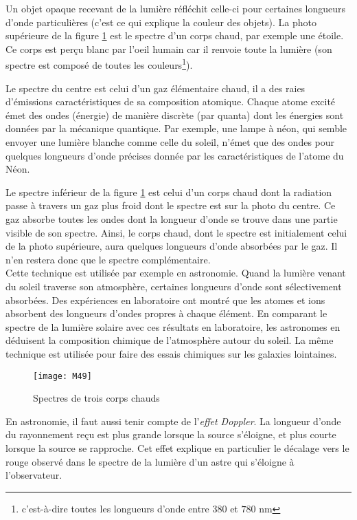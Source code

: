 \noindent Un objet opaque recevant de la lumière réfléchit celle-ci pour certaines longueurs d'onde particulières (c'est ce qui explique la couleur des objets). La photo supérieure de la figure \ref{d15} est le spectre d'un corps chaud, par exemple une étoile. Ce corps est perçu blanc par l'oeil humain car il renvoie toute la lumière (son spectre est composé de toutes les couleurs\footnote{c'est-à-dire toutes les longueurs d'onde entre $380$ et $780$ nm}).

\noindent Le spectre du centre est celui d'un gaz élémentaire chaud, il a des raies d'émissions caractéristiques de sa composition atomique. Chaque atome excité émet des ondes (énergie) de manière discrète (par quanta) dont les énergies sont données par la mécanique quantique. Par exemple, une lampe à néon, qui semble envoyer une lumière blanche comme celle du soleil, n'émet que des ondes pour quelques longueurs d'onde précises donnée par les caractéristiques de l'atome du Néon.

\noindent Le spectre inférieur de la figure \ref{d15} est celui d'un corps chaud dont la radiation passe à travers un gaz plus froid dont le spectre est sur la photo du centre. Ce gaz absorbe toutes les ondes dont la longueur d'onde se trouve dans une partie visible de son spectre. Ainsi, le corps chaud, dont le spectre est initialement celui de la photo supérieure, aura quelques longueurs d'onde absorbées par le gaz. Il n'en restera donc que le spectre complémentaire.\\

\noindent Cette technique est utilisée par exemple en astronomie. Quand la lumière venant du soleil traverse son atmosphère, certaines longueurs d'onde sont sélectivement absorbées. Des expériences en laboratoire ont montré que les atomes et ions absorbent des longueurs d'ondes propres à chaque élément. En comparant le spectre de la lumière solaire avec ces résultats en laboratoire, les astronomes en déduisent la composition chimique de l'atmosphère autour du soleil. La même technique est utilisée pour faire des essais chimiques sur les galaxies lointaines.

\begin{figure}[h!]
    \centering
    \texttt{[image: M49]}
    \caption{Spectres de trois corps chauds}
    \label{d15}
\end{figure}

\noindent En astronomie, il faut aussi tenir compte de l'\textit{effet Doppler}. La longueur d'onde du rayonnement reçu est plus grande lorsque la source s'éloigne, et plus courte lorsque la source se rapproche.
Cet effet explique en particulier le décalage vers le rouge observé dans le spectre de la lumière d'un astre qui s'éloigne à l'observateur.\\

